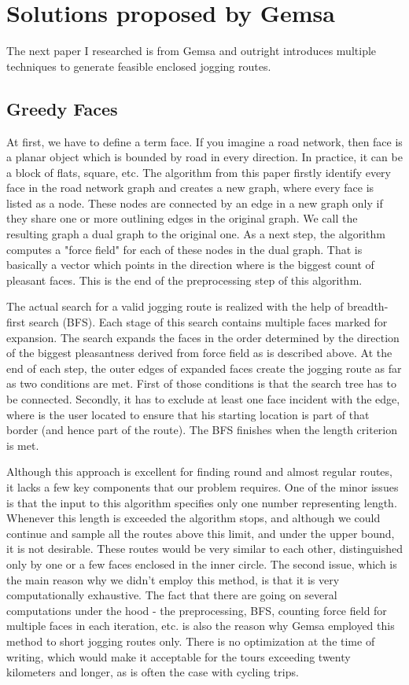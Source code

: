 \documentclass{ctuthesis}
\begin{document}
\section{Solutions proposed by Gemsa}
The next paper I researched is from Gemsa and outright introduces multiple techniques to generate feasible enclosed jogging routes.\cite{jogging} \par

\subsection{Greedy Faces}
At first, we have to define a term face. If you imagine a road network, then face is a planar object which is bounded by road in every direction. In practice, it can be a block of flats, square, etc. The algorithm from this paper firstly identify every face in the road network graph and creates a new graph, where every face is listed as a node. These nodes are connected by an edge in a new graph only if they share one or more outlining edges in the original graph. We call the resulting graph a dual graph to the original one. As a next step, the algorithm computes a "force field" for each of these nodes in the dual graph. That is basically a vector which points in the direction where is the biggest count of pleasant faces. This is the end of the preprocessing step of this algorithm. \par
The actual search for a valid jogging route is realized with the help of breadth-first search (BFS)\cite{bfs}. Each stage of this search contains multiple faces marked for expansion. The search expands the faces in the order determined by the direction of the biggest pleasantness derived from force field as is described above.
 At the end of each step, the outer edges of expanded faces create the jogging route as far as two conditions are met. First of those conditions is that the search tree has to be connected. Secondly, it has to exclude at least one face incident with the edge, where is the user located to ensure that his starting location is part of that border (and hence part of the route). The BFS finishes when the length criterion is met.\par 
Although this approach is excellent for finding round and almost regular routes, it lacks a few key components that our problem requires. One of the minor issues is that the input to this algorithm specifies only one number representing length. Whenever this length is exceeded the algorithm stops, and although we could continue and sample all the routes above this limit, and under the upper bound, it is not desirable. These routes would be very similar to each other, distinguished only by one or a few faces enclosed in the inner circle. The second issue, which is the main reason why we didn't employ this method, is that it is very computationally exhaustive.  The fact that there are going on several computations under the hood - the preprocessing, BFS, counting force field for multiple faces in each iteration, etc. is also the reason why Gemsa employed this method to short jogging routes only. There is no optimization at the time of writing, which would make it acceptable for the tours exceeding twenty kilometers and longer, as is often the case with cycling trips.
\end{document}
